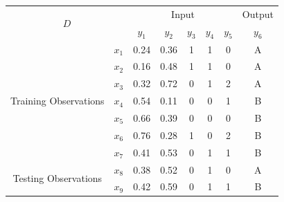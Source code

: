 \documentclass{article}
\begin{document}
\begin{table}[h!]
\centering
\begin{tabular}{|cc|ccccc|c|}
\hline
\multicolumn{2}{|c|}{\multirow{2}{*}{$D$}}                           & \multicolumn{5}{c|}{Input}                                                                                                & \multicolumn{1}{l|}{Output} \\ \cline{3-8} 
\multicolumn{2}{|c|}{}                                               & \multicolumn{1}{c|}{$y_1$} & \multicolumn{1}{c|}{$y_2$} & \multicolumn{1}{c|}{$y_3$} & \multicolumn{1}{c|}{$y_4$} & $y_5$ & $y_6$                       \\ \hline
\multicolumn{1}{|c|}{\multirow{7}{*}{Training Observations}} & $x_1$ & \multicolumn{1}{c|}{0.24}  & \multicolumn{1}{c|}{0.36}  & \multicolumn{1}{c|}{1}     & \multicolumn{1}{c|}{1}     & 0     & A                           \\ \cline{2-8} 
\multicolumn{1}{|c|}{}                                       & $x_2$ & \multicolumn{1}{c|}{0.16}  & \multicolumn{1}{c|}{0.48}  & \multicolumn{1}{c|}{1}     & \multicolumn{1}{c|}{1}     & 0     & A                           \\ \cline{2-8} 
\multicolumn{1}{|c|}{}                                       & $x_3$ & \multicolumn{1}{c|}{0.32}  & \multicolumn{1}{c|}{0.72}  & \multicolumn{1}{c|}{0}     & \multicolumn{1}{c|}{1}     & 2     & A                           \\ \cline{2-8} 
\multicolumn{1}{|c|}{}                                       & $x_4$ & \multicolumn{1}{c|}{0.54}  & \multicolumn{1}{c|}{0.11}  & \multicolumn{1}{c|}{0}     & \multicolumn{1}{c|}{0}     & 1     & B                           \\ \cline{2-8} 
\multicolumn{1}{|c|}{}                                       & $x_5$ & \multicolumn{1}{c|}{0.66}  & \multicolumn{1}{c|}{0.39}  & \multicolumn{1}{c|}{0}     & \multicolumn{1}{c|}{0}     & 0     & B                           \\ \cline{2-8} 
\multicolumn{1}{|c|}{}                                       & $x_6$ & \multicolumn{1}{c|}{0.76}  & \multicolumn{1}{c|}{0.28}  & \multicolumn{1}{c|}{1}     & \multicolumn{1}{c|}{0}     & 2     & B                           \\ \cline{2-8} 
\multicolumn{1}{|c|}{}                                       & $x_7$ & \multicolumn{1}{c|}{0.41}  & \multicolumn{1}{c|}{0.53}  & \multicolumn{1}{c|}{0}     & \multicolumn{1}{c|}{1}     & 1     & B                           \\ \hline
\multicolumn{1}{|c|}{\multirow{2}{*}{Testing Observations}}  & $x_8$ & \multicolumn{1}{c|}{0.38}  & \multicolumn{1}{c|}{0.52}  & \multicolumn{1}{c|}{0}     & \multicolumn{1}{c|}{1}     & 0     & A                           \\ \cline{2-8} 
\multicolumn{1}{|c|}{}                                       & $x_9$ & \multicolumn{1}{c|}{0.42}  & \multicolumn{1}{c|}{0.59}  & \multicolumn{1}{c|}{0}     & \multicolumn{1}{c|}{1}     & 1     & B                           \\ \hline
\end{tabular}
\end{table}
\end{document}
